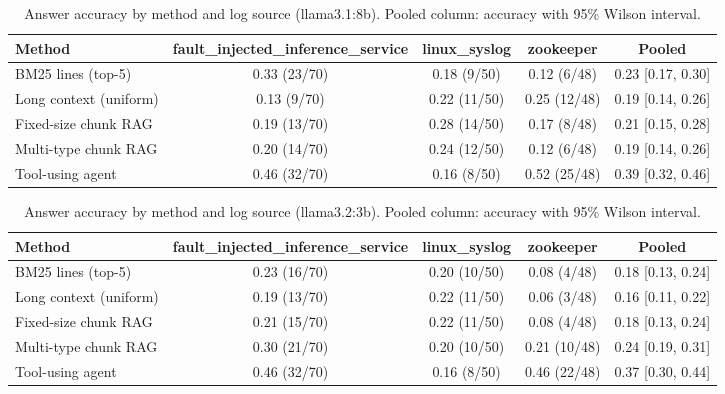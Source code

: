\begin{table}[t]
\centering
\caption{Answer accuracy by method and log source (llama3.1:8b). Pooled column: accuracy with 95\% Wilson interval.}
\label{tab:main_comparison__llama3_1_8b}
\begin{tabular}{@{}lcccc@{}}
\toprule
Method & fault\_injected\_inference\_service & linux\_syslog & zookeeper & Pooled \\
\midrule
BM25 lines (top-5) & 0.33 (23/70) & 0.18 (9/50) & 0.12 (6/48) & 0.23 [0.17, 0.30] \\
Long context (uniform) & 0.13 (9/70) & 0.22 (11/50) & 0.25 (12/48) & 0.19 [0.14, 0.26] \\
Fixed-size chunk RAG & 0.19 (13/70) & 0.28 (14/50) & 0.17 (8/48) & 0.21 [0.15, 0.28] \\
Multi-type chunk RAG & 0.20 (14/70) & 0.24 (12/50) & 0.12 (6/48) & 0.19 [0.14, 0.26] \\
Tool-using agent & 0.46 (32/70) & 0.16 (8/50) & 0.52 (25/48) & 0.39 [0.32, 0.46] \\
\bottomrule
\end{tabular}
\end{table}

\begin{table}[t]
\centering
\caption{Answer accuracy by method and log source (llama3.2:3b). Pooled column: accuracy with 95\% Wilson interval.}
\label{tab:main_comparison__llama3_2_3b}
\begin{tabular}{@{}lcccc@{}}
\toprule
Method & fault\_injected\_inference\_service & linux\_syslog & zookeeper & Pooled \\
\midrule
BM25 lines (top-5) & 0.23 (16/70) & 0.20 (10/50) & 0.08 (4/48) & 0.18 [0.13, 0.24] \\
Long context (uniform) & 0.19 (13/70) & 0.22 (11/50) & 0.06 (3/48) & 0.16 [0.11, 0.22] \\
Fixed-size chunk RAG & 0.21 (15/70) & 0.22 (11/50) & 0.08 (4/48) & 0.18 [0.13, 0.24] \\
Multi-type chunk RAG & 0.30 (21/70) & 0.20 (10/50) & 0.21 (10/48) & 0.24 [0.19, 0.31] \\
Tool-using agent & 0.46 (32/70) & 0.16 (8/50) & 0.46 (22/48) & 0.37 [0.30, 0.44] \\
\bottomrule
\end{tabular}
\end{table}

